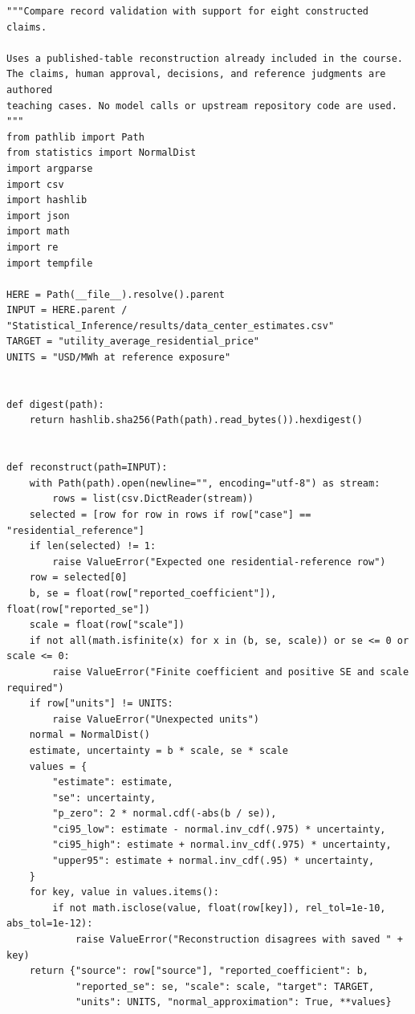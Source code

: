 \begin{Verbatim}[breaklines,breakanywhere,fontsize=\small]
"""Compare record validation with support for eight constructed claims.

Uses a published-table reconstruction already included in the course.
The claims, human approval, decisions, and reference judgments are authored
teaching cases. No model calls or upstream repository code are used.
"""
from pathlib import Path
from statistics import NormalDist
import argparse
import csv
import hashlib
import json
import math
import re
import tempfile

HERE = Path(__file__).resolve().parent
INPUT = HERE.parent / "Statistical_Inference/results/data_center_estimates.csv"
TARGET = "utility_average_residential_price"
UNITS = "USD/MWh at reference exposure"


def digest(path):
    return hashlib.sha256(Path(path).read_bytes()).hexdigest()


def reconstruct(path=INPUT):
    with Path(path).open(newline="", encoding="utf-8") as stream:
        rows = list(csv.DictReader(stream))
    selected = [row for row in rows if row["case"] == "residential_reference"]
    if len(selected) != 1:
        raise ValueError("Expected one residential-reference row")
    row = selected[0]
    b, se = float(row["reported_coefficient"]), float(row["reported_se"])
    scale = float(row["scale"])
    if not all(math.isfinite(x) for x in (b, se, scale)) or se <= 0 or scale <= 0:
        raise ValueError("Finite coefficient and positive SE and scale required")
    if row["units"] != UNITS:
        raise ValueError("Unexpected units")
    normal = NormalDist()
    estimate, uncertainty = b * scale, se * scale
    values = {
        "estimate": estimate,
        "se": uncertainty,
        "p_zero": 2 * normal.cdf(-abs(b / se)),
        "ci95_low": estimate - normal.inv_cdf(.975) * uncertainty,
        "ci95_high": estimate + normal.inv_cdf(.975) * uncertainty,
        "upper95": estimate + normal.inv_cdf(.95) * uncertainty,
    }
    for key, value in values.items():
        if not math.isclose(value, float(row[key]), rel_tol=1e-10, abs_tol=1e-12):
            raise ValueError("Reconstruction disagrees with saved " + key)
    return {"source": row["source"], "reported_coefficient": b,
            "reported_se": se, "scale": scale, "target": TARGET,
            "units": UNITS, "normal_approximation": True, **values}



\end{Verbatim}
